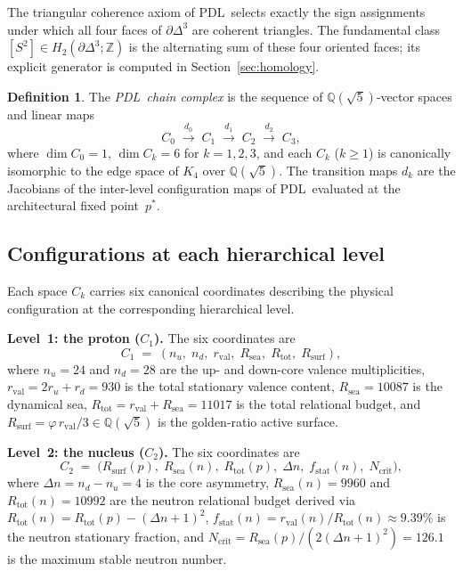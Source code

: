 \documentclass[11pt,a4paper]{article}
\theoremstyle{definition}
\newtheorem{definition}[theorem]{Definition}
\newcommand{\PDL}{\textnormal{PDL}}
\newcommand{\Rsurf}{R_{\mathrm{surf}}}
\newcommand{\Rsea}{R_{\mathrm{sea}}}
\newcommand{\Rtot}{R_{\mathrm{tot}}}
\newcommand{\rval}{r_{\mathrm{val}}}
\newcommand{\Kfour}{K_4}
\newcommand{\Sfour}{\partial\Delta^3}
\newcommand{\Hk}[1]{H_{#1}}
\newcommand{\dmap}[1]{d_{#1}}
\newcommand{\vp}{\varphi}
\begin{document}
The triangular coherence axiom of \PDL\ selects exactly the sign assignments under which all four faces of $\Sfour$ are coherent triangles. The fundamental class $[S^2] \in \Hk{2}(\Sfour;\mathbb{Z})$ is the alternating sum of these four oriented faces; its explicit generator is computed in Section~\ref{sec:homology}.

\begin{definition}
  \label{def:chain_complex}
  The \emph{\PDL\ chain complex} is the sequence of $\mathbb{Q}(\sqrt{5})$-vector spaces and linear maps
  \[
    C_0 \;\xrightarrow{\dmap{0}}\; C_1 \;\xrightarrow{\dmap{1}}\; C_2 \;\xrightarrow{\dmap{2}}\; C_3,
  \]
  where $\dim C_0 = 1$, $\dim C_k = 6$ for $k = 1, 2, 3$, and each $C_k$ ($k \geq 1$) is canonically isomorphic to the edge space of $\Kfour$ over $\mathbb{Q}(\sqrt{5})$. The transition maps $\dmap{k}$ are the Jacobians of the inter-level configuration maps of \PDL\ evaluated at the architectural fixed point~$p^*$.
\end{definition}

\subsection{Configurations at each hierarchical level}
\label{subsec:configs}

Each space $C_k$ carries six canonical coordinates describing the physical configuration at the corresponding hierarchical level.

\medskip\noindent\textbf{Level~1: the proton ($C_1$).} The six coordinates are
\[
  C_1 \;=\; (n_u,\; n_d,\; \rval,\; \Rsea,\; \Rtot,\; \Rsurf),
\]
where $n_u = 24$ and $n_d = 28$ are the up- and down-core valence multiplicities, $\rval = 2r_u + r_d = 930$ is the total stationary valence content, $\Rsea = 10087$ is the dynamical sea, $\Rtot = \rval + \Rsea = 11017$ is the total relational budget, and $\Rsurf = \vp\,\rval/3 \in \mathbb{Q}(\sqrt{5})$ is the golden-ratio active surface.\cite{Combinatorial_Proton_v2_2026,Alpha_PDL_v2_2026}

\medskip\noindent\textbf{Level~2: the nucleus ($C_2$).} The six coordinates are
\[
  C_2 \;=\; \bigl(\Rsurf(p),\; \Rsea(n),\; \Rtot(p),\; \Delta n,\; f_{\mathrm{stat}}(n),\; N_{\mathrm{crit}}\bigr),
\]
where $\Delta n = n_d - n_u = 4$ is the core asymmetry, $\Rsea(n) = 9960$ and $\Rtot(n) = 10992$ are the neutron relational budget derived via $\Rtot(n) = \Rtot(p) - (\Delta n+1)^2$,\cite{Nuclear_Stability_PDL_2026} $f_{\mathrm{stat}}(n) = \rval(n)/\Rtot(n) \approx 9.39\%$ is the neutron stationary fraction, and $N_{\mathrm{crit}} = \Rsea(p)/(2(\Delta n+1)^2) = 126.1$ is the maximum stable neutron number.
\end{document}
